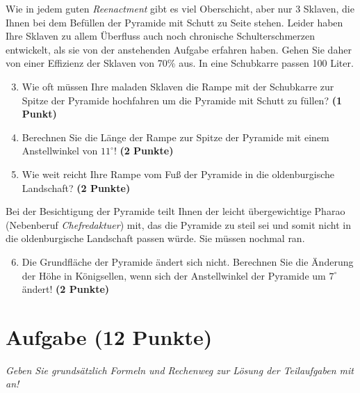 \documentclass[a4paper, 10pt]{scrartcl}\usepackage[]{graphicx}\usepackage[]{xcolor}
\begin{document}
Wie in jedem guten \textit{Reenactment} gibt es viel Oberschicht, aber nur
3 Sklaven, die Ihnen bei dem Bef{\"u}llen der Pyramide mit Schutt
zu Seite stehen. Leider haben Ihre Sklaven zu allem {\"U}berfluss auch noch
chronische Schulterschmerzen entwickelt, als sie von der
anstehenden Aufgabe erfahren haben. Gehen Sie daher von einer Effizienz der
Sklaven von 70\% aus. In eine Schubkarre passen
100 Liter.

\begin{enumerate}
  \setcounter{enumi}{2}
\item Wie oft m{\"u}ssen Ihre maladen Sklaven die Rampe mit der Schubkarre
  zur Spitze der Pyramide hochfahren um die Pyramide mit Schutt zu f{\"u}llen? \textbf{(1 Punkt)}
\item Berechnen Sie die L{\"a}nge der Rampe zur Spitze der Pyramide mit einem
  Anstellwinkel von $11^\circ$! \textbf{(2 Punkte)}
\item Wie weit reicht Ihre Rampe vom Fu{\ss} der Pyramide in die oldenburgische
  Landschaft?  \textbf{(2 Punkte)}
\end{enumerate}

Bei der Besichtigung der Pyramide teilt Ihnen der leicht {\"u}bergewichtige
Pharao (Nebenberuf \textit{Chefredaktuer}) mit, das die Pyramide zu
steil sei und somit nicht in die oldenburgische Landschaft passen
w{\"u}rde. Sie m{\"u}ssen nochmal ran.

\begin{enumerate}
  \setcounter{enumi}{5}
\item Die Grundfl{\"a}che der Pyramide {\"a}ndert sich nicht. Berechnen Sie die
  {\"A}nderung der H{\"o}he in K{\"o}nigsellen, wenn sich der Anstellwinkel der
  Pyramide um $7^\circ$ {\"a}ndert!  \textbf{(2 Punkte)}
\end{enumerate}



\clearpage

\section{Aufgabe \hfill (12 Punkte)}

\textit{Geben Sie grunds{\"a}tzlich Formeln und Rechenweg zur L{\"o}sung der
  Teilaufgaben mit an!} \\[1Ex]
\end{document}
